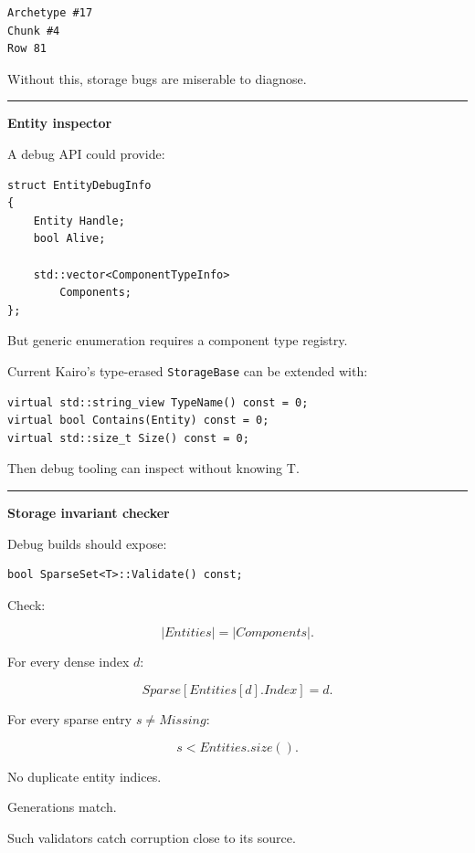 \begin{verbatim}
Archetype #17
Chunk #4
Row 81
\end{verbatim}

Without this, storage bugs are miserable to diagnose.

\begin{center}\rule{0.5\linewidth}{0.5pt}\end{center}

\textbf{Entity inspector}

A debug API could provide:

\begin{verbatim}
struct EntityDebugInfo
{
    Entity Handle;
    bool Alive;

    std::vector<ComponentTypeInfo>
        Components;
};
\end{verbatim}

But generic enumeration requires a component type registry.

Current Kairo's type-erased \texttt{StorageBase} can be extended with:

\begin{verbatim}
virtual std::string_view TypeName() const = 0;
virtual bool Contains(Entity) const = 0;
virtual std::size_t Size() const = 0;
\end{verbatim}

Then debug tooling can inspect without knowing T.

\begin{center}\rule{0.5\linewidth}{0.5pt}\end{center}

\textbf{Storage invariant checker}

Debug builds should expose:

\begin{verbatim}
bool SparseSet<T>::Validate() const;
\end{verbatim}

Check:

\[
|Entities|=|Components|.
\]

For every dense index \(d\):

\[
Sparse[Entities[d].Index]=d.
\]

For every sparse entry \(s\neq Missing\):

\[
s<Entities.size().
\]

No duplicate entity indices.

Generations match.

Such validators catch corruption close to its source.

